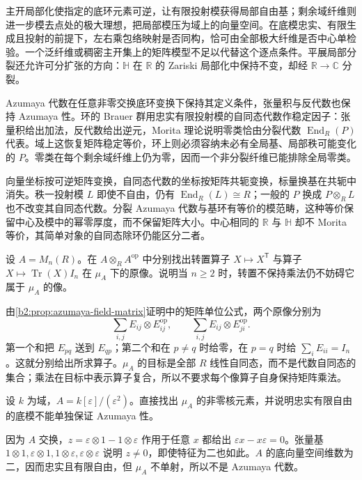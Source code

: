 \begin{chaptersummary}
	主开局部化使指定的底环元素可逆，让有限投射模获得局部自由基；剩余域纤维则进一步模去点处的极大理想，把局部模压为域上的向量空间。在底模忠实、有限生成且投射的前提下，左右乘包络映射是否同构，恰可由全部极大纤维是否中心单检验。一个泛纤维或稠密主开集上的矩阵模型不足以代替这个逐点条件。平展局部分裂还允许可分扩张的方向：\(\mathbb H\) 在 \(\mathbb R\) 的 Zariski 局部化中保持不变，却经 \(\mathbb R\rightarrow\mathbb C\) 分裂。

	\ProseParagraphBreak
	Azumaya 代数在任意非零交换底环变换下保持其定义条件，张量积与反代数也保持 Azumaya 性。环的 Brauer 群用忠实有限投射模的自同态代数作稳定因子：张量积给出加法，反代数给出逆元，Morita 理论说明零类恰由分裂代数 \(\operatorname{End}_R(P)\) 代表。域上这恢复矩阵稳定等价，环上则必须容纳未必有全局基、局部秩可能变化的 \(P\)。零类在每个剩余域纤维上仍为零，因而一个非分裂纤维已能排除全局零类。

	\ProseParagraphBreak
	向量坐标按可逆矩阵变换，自同态代数的坐标按矩阵共轭变换，标量换基在共轭中消失。秩一投射模 \(L\) 即使不自由，仍有 \(\operatorname{End}_R(L)\cong R\)；一般的 \(P\) 换成 \(P\otimes_RL\) 也不改变其自同态代数。分裂 Azumaya 代数与基环有等价的模范畴，这种等价保留中心及模中的幂零厚度，而不保留矩阵大小。中心相同的 \(\mathbb R\) 与 \(\mathbb H\) 却不 Morita 等价，其简单对象的自同态除环仍能区分二者。
\end{chaptersummary}

\BookExercises

\begin{exercise}\label{b2:ex:C-transpose-tensor}
	设 \(A=M_n(R)\)。在 \(A\otimes_RA^{\mathrm{op}}\) 中分别找出转置算子 \(X\mapsto X^{\mathsf T}\) 与算子 \(X\mapsto\operatorname{Tr}(X)I_n\) 在 \(\mu_A\) 下的原像。说明当 \(n\ge2\) 时，转置不保持乘法仍不妨碍它属于 \(\mu_A\) 的像。
\end{exercise}
\begin{solution}
	由\cref{b2:prop:azumaya-field-matrix}证明中的矩阵单位公式，两个原像分别为
	\[
		\sum_{i,j}E_{ij}\otimes E_{ij}^{\mathrm{op}}, \qquad \sum_{i,j}E_{ij}\otimes E_{ji}^{\mathrm{op}}.
	\]
	第一个和把 \(E_{pq}\) 送到 \(E_{qp}\)；第二个和在 \(p\ne q\) 时给零，在 \(p=q\) 时给 \(\sum_iE_{ii}=I_n\)。这就分别给出所求算子。\(\mu_A\) 的目标是全部 \(R\) 线性自同态，而不是代数自同态的集合；乘法在目标中表示算子复合，所以不要求每个像算子自身保持矩阵乘法。
\end{solution}

\begin{exercise}\label{b2:ex:C-dual-number-failure}
	设 \(k\) 为域，\(A=k[\varepsilon]/(\varepsilon^2)\)。直接找出 \(\mu_A\) 的非零核元素，并说明忠实有限自由的底模不能单独保证 Azumaya 性。
\end{exercise}
\begin{solution}
	因为 \(A\) 交换，\(z=\varepsilon\otimes1-1\otimes\varepsilon\) 作用于任意 \(x\) 都给出 \(\varepsilon x-x\varepsilon=0\)。张量基 \(1\otimes1,\varepsilon\otimes1,1\otimes\varepsilon,\varepsilon\otimes\varepsilon\) 说明 \(z\ne0\)，即使特征为二也如此。\(A\) 的底向量空间维数为二，因而忠实且有限自由，但 \(\mu_A\) 不单射，所以不是 Azumaya 代数。
\end{solution}

